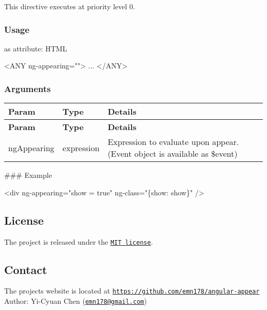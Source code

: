 This directive executes at priority level 0.

\subsubsection*{Usage}

as attribute\+: H\+T\+ML 
\begin{DoxyCode}
<ANY
  ng-appearing="">
...
</ANY>
\end{DoxyCode}
 \subsubsection*{Arguments}

\tabulinesep=1mm
\begin{longtabu} spread 0pt [c]{*{3}{|X[-1]}|}
\hline
\rowcolor{\tableheadbgcolor}\textbf{ Param }&\textbf{ Type }&\textbf{ Details  }\\
\endfirsthead
\hline
\endfoot
\hline
\rowcolor{\tableheadbgcolor}\textbf{ Param }&\textbf{ Type }&\textbf{ Details  }\\
\endhead
ng\+Appearing &expression &Expression to evaluate upon appear. (Event object is available as \$event) \\
\end{longtabu}
\#\#\# Example 
\begin{DoxyCode}
<div ng-appearing="show = true" ng-class="\{show: show\}" />
\end{DoxyCode}


\subsection*{License}

The project is released under the \href{http://www.opensource.org/licenses/MIT}{\tt M\+IT license}.

\subsection*{Contact}

The project\textquotesingle{}s website is located at \href{https://github.com/emn178/angular-appear}{\tt https\+://github.\+com/emn178/angular-\/appear} Author\+: Yi-\/\+Cyuan Chen (\href{mailto:emn178@gmail.com}{\tt emn178@gmail.\+com}) 